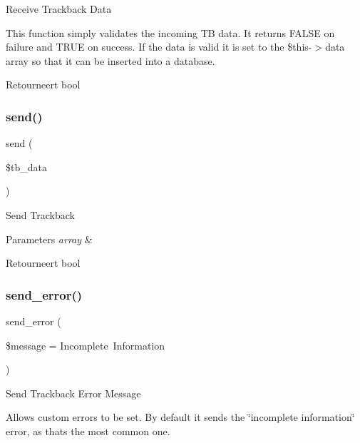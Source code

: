 Receive Trackback Data

This function simply validates the incoming TB data. It returns F\+A\+L\+SE on failure and T\+R\+UE on success. If the data is valid it is set to the \$this-\/$>$data array so that it can be inserted into a database.

\begin{DoxyReturn}{Retourneert}
bool 
\end{DoxyReturn}
\mbox{\label{class_c_i___trackback_a4ee54341ef16e67ca033704f4373a56b}} 
\subsubsection{\texorpdfstring{send()}{send()}}
{\footnotesize\ttfamily send (\begin{DoxyParamCaption}\item[{}]{\$tb\+\_\+data }\end{DoxyParamCaption})}

Send Trackback


\begin{DoxyParams}{Parameters}
{\em array} & \\
\hline
\end{DoxyParams}
\begin{DoxyReturn}{Retourneert}
bool 
\end{DoxyReturn}
\mbox{\label{class_c_i___trackback_a1d4188b1ba4d71ad5392bee635102e87}} 
\subsubsection{\texorpdfstring{send\_error()}{send\_error()}}
{\footnotesize\ttfamily send\+\_\+error (\begin{DoxyParamCaption}\item[{}]{\$message = {\ttfamily \textquotesingle{}Incomplete~Information\textquotesingle{}} }\end{DoxyParamCaption})}

Send Trackback Error Message

Allows custom errors to be set. By default it sends the \char`\"{}incomplete information\char`\"{} error, as that\textquotesingle{}s the most common one.


